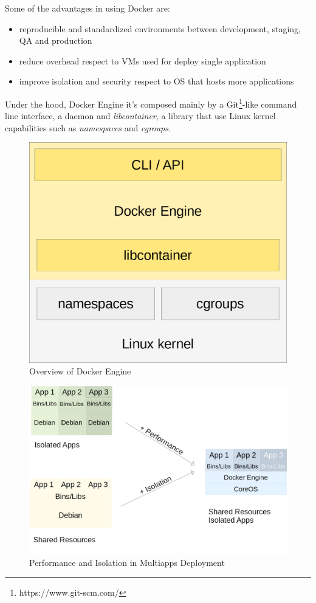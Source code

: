 Some of the advantages in using Docker are:

\begin{itemize}

\item
  reproducible and standardized environments between development,
  staging, QA and production
\item
  reduce overhead respect to VMs used for deploy single application
\item
  improve isolation and security respect to OS that hosts more
  applications
\end{itemize}

Under the hood, Docker Engine it's composed mainly by a Git\footnote{https://www.git-scm.com/}-like command
line interface, a daemon and \textit{libcontainer}, a library that use
Linux kernel capabilities such as \textit{namespaces} and \textit{cgroups}.

\begin{figure}[htbp]
\centering
\includegraphics{media/ch3-docker.png}
\caption{Overview of Docker Engine}
\end{figure}

\begin{figure}[htbp]
\centering
\includegraphics{media/ch3-docker_multiapps.png}
\caption{Performance and Isolation in Multiapps Deployment}
\end{figure}

